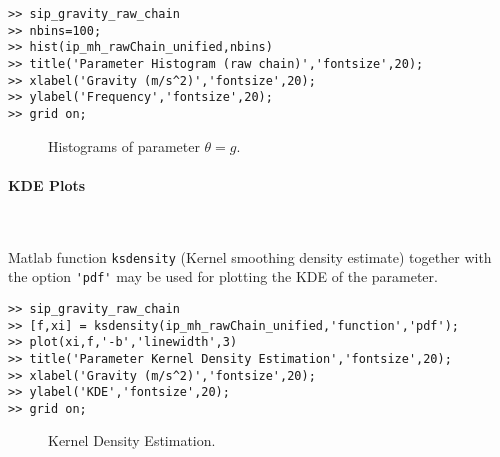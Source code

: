 \begin{lstlisting}[label=matlab:hist,caption={Matlab code for the histogram plot.}]
% inside Matlab
>> sip_gravity_raw_chain
>> nbins=100;
>> hist(ip_mh_rawChain_unified,nbins)
>> title('Parameter Histogram (raw chain)','fontsize',20);
>> xlabel('Gravity (m/s^2)','fontsize',20);
>> ylabel('Frequency','fontsize',20);
>> grid on;
\end{lstlisting}

\begin{figure}[p]
\centering
{}
\vspace*{-10pt}
\caption{Histograms of parameter $\theta=g$. }
\end{figure}

\paragraph{KDE Plots} \

Matlab function \verb+ksdensity+ (Kernel smoothing density estimate) together with the
option \verb+'pdf'+ may be used for plotting the KDE of the parameter.
\begin{lstlisting}[label=matlab:kde,caption={Matlab code for the KDE plot.}]
% inside Matlab
>> sip_gravity_raw_chain
>> [f,xi] = ksdensity(ip_mh_rawChain_unified,'function','pdf');
>> plot(xi,f,'-b','linewidth',3)
>> title('Parameter Kernel Density Estimation','fontsize',20);
>> xlabel('Gravity (m/s^2)','fontsize',20);
>> ylabel('KDE','fontsize',20);
>> grid on;
\end{lstlisting}

\begin{figure}[p]
\centering
{}
\vspace*{-10pt}
\caption{Kernel Density Estimation. }
\end{figure}


